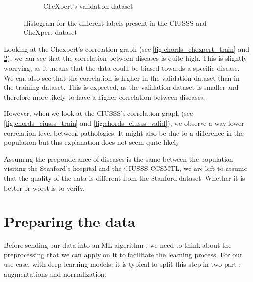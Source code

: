 \documentclass[11pt]{article}
\begin{document}
\begin{figure}[!h]
\begin{subfigure}[b]{0.45\linewidth}
         \caption{CheXpert's validation dataset}
         \vspace{4ex}
         \label{fig:chords_chexpert_valid}
     \end{subfigure}

     \caption{Histogram for the different labels present in the CIUSSS and CheXpert dataset}

\end{figure}


    Looking at the Chexpert's correlation graph (see \ref{fig:chords_chexpert_train} and \ref{fig:chords_chexpert_valid}), we can see that the correlation between diseases is quite high. This is slightly worrying, as it means that the data could be biased
    towards a specific disease. We can also see that the correlation is higher in the validation dataset than in the training
    dataset. This is expected, as the validation dataset is smaller and therefore more likely to have a higher correlation
    between diseases.


    However, when we look at the CIUSSS's correlation graph (see \ref{fig:chords_ciusss_train} and \ref{fig:chords_ciusss_valid}), we observe a way lower correlation level between pathologies.
    It might also be due to a difference in the population but this explanation does not seem quite likely

    Assuming the preponderance of diseases is the same between the population visiting the Stanford's hospital and
    the CIUSSS CCSMTL, we are left to assume that the quality of the data is different from the Stanford dataset. Whether it is better or worst is to verify.


    \section{Preparing the data}



    Before sending our data into an ML algorithm , we need to think about the preprocessing that we can apply on it to facilitate
    the learning process. For our use case, with deep learning models, it is typical to split this step in two part : augmentations
    and normalization.
\end{document}
